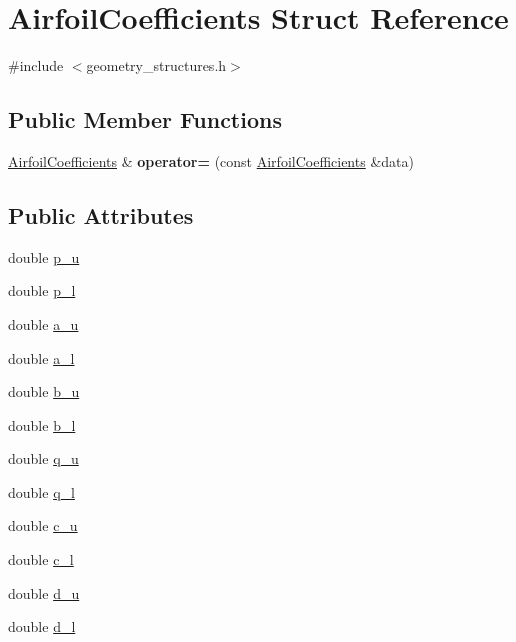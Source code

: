 \hypertarget{struct_airfoil_coefficients}{}\section{Airfoil\+Coefficients Struct Reference}
\label{struct_airfoil_coefficients}


{\ttfamily \#include $<$geometry\+\_\+structures.\+h$>$}

\subsection*{Public Member Functions}
\begin{DoxyCompactItemize}
\item 
\hypertarget{struct_airfoil_coefficients_a36d875f89ad1d4b3404dfd6ff68c4660}{}\label{struct_airfoil_coefficients_a36d875f89ad1d4b3404dfd6ff68c4660} 
\hyperlink{struct_airfoil_coefficients}{Airfoil\+Coefficients} \& {\bfseries operator=} (const \hyperlink{struct_airfoil_coefficients}{Airfoil\+Coefficients} \&data)
\end{DoxyCompactItemize}
\subsection*{Public Attributes}
\begin{DoxyCompactItemize}
\item 
double \hyperlink{struct_airfoil_coefficients_a206b443b0e4e9ab91ec2d4f6570f687d}{p\+\_\+u}
\item 
double \hyperlink{struct_airfoil_coefficients_a1b195a3d499c8c050ccb05faeba65c9f}{p\+\_\+l}
\item 
double \hyperlink{struct_airfoil_coefficients_a7987ccdf3ca120dc8b96004cea2808c4}{a\+\_\+u}
\item 
double \hyperlink{struct_airfoil_coefficients_a9b8421053a97ec5dcf0bc1cc6dd7e2a1}{a\+\_\+l}
\item 
double \hyperlink{struct_airfoil_coefficients_aaa3ac1f49bc08223607d6ac4864baaae}{b\+\_\+u}
\item 
double \hyperlink{struct_airfoil_coefficients_ab6c29fe2ddce0a9b700d2a312791995a}{b\+\_\+l}
\item 
double \hyperlink{struct_airfoil_coefficients_a5d7aa2c02b9adfe9adcc86d2034f647f}{q\+\_\+u}
\item 
double \hyperlink{struct_airfoil_coefficients_aed33b0307a2bfcee3531fa2b240de679}{q\+\_\+l}
\item 
double \hyperlink{struct_airfoil_coefficients_a89bcbee889a35e1a184014b750195b37}{c\+\_\+u}
\item 
double \hyperlink{struct_airfoil_coefficients_aadd3f8683942976ea04c91b2afef18ad}{c\+\_\+l}
\item 
double \hyperlink{struct_airfoil_coefficients_ac294ea7a2fc38be4f61680e0e30290a1}{d\+\_\+u}
\item 
double \hyperlink{struct_airfoil_coefficients_abc1b88aeefdc2659a2585532a426279f}{d\+\_\+l}
\end{DoxyCompactItemize}


